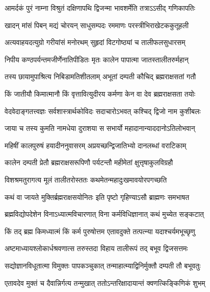 \twolineshloka
{आमर्दकं पुरं नाम्ना विश्रुतं दक्षिणापथि}
{द्विजन्मा भावशर्मेति तत्राऽऽसीद् गणिकापतिः} %

\twolineshloka
{खादन् मांसं पिबन् मद्यं चोरयन् साधुसम्पदः}
{रममाणः परस्त्रीभिराखेटककुतूहली} %

\twolineshloka
{अत्यवाहयदत्युग्रो गरीयांसं मनोरथम्}
{सुहृदां विटगोष्ठ्यां च तालीफलसुधारसम्} %

\twolineshloka
{निपीय कण्ठपर्यन्तमजीर्णेनातिपीडितः}
{मृतः कालेन पापात्मा जातस्तालीतरुर्महान्} %

\twolineshloka
{तस्य छायामुपाश्रित्य निबिडामतिशीतलाम्}
{अभूतां दम्पती कौचिद् ब्रह्मराक्षसतां गतौ} %


\twolineshloka
{किं जातीयौ किमात्मानौ किं वृत्तावित्युदीरय}
{कर्मणा केन वा देव ब्रह्मराक्षसता तयोः} %


\twolineshloka
{वेदवेदाङ्गतत्त्वज्ञः सर्वशास्त्रार्थकोविदः}
{सदाचारोऽभवत् कश्चिद् द्विजो नाम कुशीबलः} %

\twolineshloka
{जाया च तस्य कुमति नामधेया दुराशया}
{स सभार्यो महादानान्याददानोऽतिलोभवान्} %

\twolineshloka
{महिषीं कालपुरुषं हयादीननुवासरम्}
{अप्रयच्छन्द्विजातिभ्यो दानलब्धां वराटिकाम्} %

\twolineshloka
{कालेन दम्पती प्रेतौ ब्रह्मराक्षसरूपिणौ}
{पर्यटन्तौ महीमेतां क्षुत्तृषाकुलविग्रहौ} %

\twolineshloka
{विशश्रमतुरागत्य मूलं तालीतरोस्ततः}
{कथमेतन्महादुःखमावयोरपगच्छति} %

\twolineshloka
{कथं वा जायते मुक्तिर्ब्रह्मराक्षसयोनितः}
{इति पृष्टो गृहिण्याऽसौ ब्राह्मणः समभाषत} %

\twolineshloka
{ब्रह्मविद्योपदेशेन विनाऽध्यात्मविचारणात्}
{विना कर्मविधिज्ञानात् कथं मुच्येत सङ्कटात्} %


\twolineshloka
{किं तद् ब्रह्म किमध्यात्मं किं कर्म पुरुषोत्तम}
{एतावदुक्ते तत्पत्न्या यदाश्चर्यमभूच्छृणु} %

\twolineshloka
{अष्टमाध्यायश्लोकार्धश्रवणात्स तरुस्तदा}
{विहाय तालीरूपं तद् बभूव द्विजसत्तमः} %

\twolineshloka
{सद्योज्ञानविधूतात्मा विमुक्तः पापकञ्चुकात्}
{तन्माहात्म्याद्विनिर्मुक्तौ दम्पती तौ बभूवतुः} %

\twolineshloka
{एतावदेव मुक्तं च दैवान्निर्गत्य तन्मुखात्}
{ततोऽन्तरिक्षादायान्तं क्वणत्किङ्किणिकं शुभम्} %

